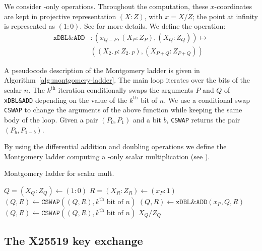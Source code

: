 We consider \xcoord-only operations. Throughout the computation,
these $x$-coordinates are kept in projective representation
$(X : Z)$, with $x = X/Z$; the point at infinity is represented as $(1:0)$.
See  for more details.
We define the operation:
\begin{align*}
  \texttt{xDBL\&ADD} & : (x_{Q-P}, (X_P:Z_P), (X_Q:Z_Q)) \mapsto              \\
                     & ((X_{2 \cdot P}:Z_{2 \cdot P}), (X_{P + Q}:Z_{P + Q}))
\end{align*}

A pseudocode description of the Montgomery ladder 
is given in Algorithm~\ref{alg:montgomery-ladder}.
The main loop iterates over the bits of the scalar $n$. 
The $k^{\text{th}}$ iteration conditionally swaps
the arguments $P$ and $Q$ of \texttt{xDBL\&ADD}
depending on the value of the $k^{\text{th}}$ bit of $n$.
We use a conditional swap \texttt{CSWAP} to change the arguments of the above
function while keeping the same body of the loop. \label{cswap}
Given a pair $(P_0, P_1)$ and a bit $b$, \texttt{CSWAP} returns the pair
$(P_b, P_{1-b})$.

By using the differential addition and doubling operations we define the Montgomery ladder
computing a \xcoord-only scalar multiplication (see ).
\begin{algorithm}
  \caption{Montgomery ladder for scalar mult.}
  \label{alg:montgomery-ladder}
  \begin{algorithmic}
    \STATE $Q = (X_Q:Z_Q) \leftarrow (1:0)$
    \STATE $R = (X_R:Z_R) \leftarrow (x_P:1)$
    \STATE $(Q,R) \leftarrow \texttt{CSWAP}((Q,R), k^{\text{th}}\text{ bit of }n)$
    \STATE $(Q,R) \leftarrow \texttt{xDBL\&ADD}(x_P,Q,R)$
    \STATE $(Q,R) \leftarrow \texttt{CSWAP}((Q,R), k^{\text{th}}\text{ bit of }n)$
    \ENDFOR
    \RETURN $X_Q/Z_Q$
  \end{algorithmic}
\end{algorithm}


\subsection{The X25519 key exchange}
\label{subsec:X25519-key-exchange}

